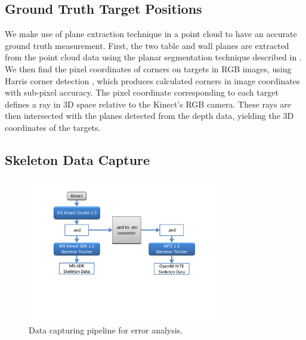 \subsection{Ground Truth Target Positions}
\label{sec:ground_truth_points}

We make use of plane extraction technique in a point cloud to have an accurate ground truth measurement. First, the two table and wall planes are extracted from the point cloud data using the planar segmentation technique described in \cite{trevor2013segmentation}. We then find the pixel coordinates of corners on targets in RGB images, using Harris corner detection \cite{harris1988combined}, which produces calculated corners in image coordinates with sub-pixel accuracy. The pixel coordinate corresponding to each target defines a ray in 3D space relative to the Kinect's RGB camera. These rays are then intersected with the planes detected from the depth data, yielding the 3D coordinates of the targets.



\subsection{Skeleton Data Capture}
\label{sec:pointing_skeleton_data_capture}

\begin{figure}[ht!]
\centering
\includegraphics[width=0.75\textwidth]{pics/xedoni_2_cropped}
\caption{Data capturing pipeline for error analysis.}
\label{fig:xedoni}
\end{figure}

